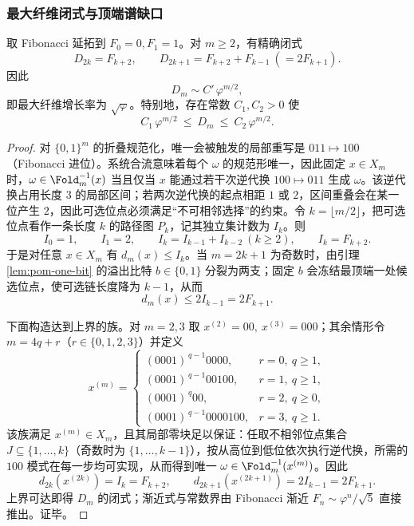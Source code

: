 \subsubsection{最大纤维闭式与顶端谱缺口}\label{subsec:pom-top-fiber}
\begin{theorem}[最大纤维闭式]\label{thm:pom-max-fiber}
取 Fibonacci 延拓到 $F_0=0,F_1=1$。对 $m\ge 2$，有精确闭式
\[
D_{2k}=F_{k+2},
\qquad
D_{2k+1}=F_{k+2}+F_{k-1}\ (=2F_{k+1}).
\]
因此
\[
D_m\sim C'\,\varphi^{m/2},
\]
即最大纤维增长率为 $\sqrt{\varphi}$。特别地，存在常数 $C_1,C_2>0$ 使
\[
C_1\,\varphi^{m/2}\ \le\ D_m\ \le\ C_2\,\varphi^{m/2}.
\]
\end{theorem}
\begin{proof}
对 $\{0,1\}^m$ 的折叠规范化，唯一会被触发的局部重写是
\(
011\mapsto 100
\)
（Fibonacci 进位）。系统合流意味着每个 $\omega$ 的规范形唯一，因此固定 $x\in X_m$ 时，$\omega\in\Fold_m^{-1}(x)$ 当且仅当 $x$ 能通过若干次逆代换 $100\mapsto 011$ 生成 $\omega$。该逆代换占用长度 $3$ 的局部区间；若两次逆代换的起点相距 $1$ 或 $2$，区间重叠会在某一位产生 $2$，因此可选位点必须满足“不可相邻选择”的约束。令 $k=\lfloor m/2\rfloor$，把可选位点看作一条长度 $k$ 的路径图 $P_k$，记其独立集计数为 $I_k$。则
\[
I_0=1,\qquad I_1=2,\qquad I_k=I_{k-1}+I_{k-2}\ (k\ge 2),
\qquad I_k=F_{k+2}.
\]
于是对任意 $x\in X_m$ 有 $d_m(x)\le I_k$。当 $m=2k+1$ 为奇数时，由引理 \ref{lem:pom-one-bit} 的溢出比特 $b\in\{0,1\}$ 分裂为两支；固定 $b$ 会冻结最顶端一处候选位点，使可选链长度降为 $k-1$，从而
\[
d_m(x)\le 2I_{k-1}=2F_{k+1}.
\]

下面构造达到上界的族。对 $m=2,3$ 取
\(
x^{(2)}=00,\ x^{(3)}=000
\)；其余情形令 $m=4q+r$（$r\in\{0,1,2,3\}$）并定义
\[
x^{(m)}=
\begin{cases}
(0001)^{\,q-1}0000,& r=0,\ q\ge 1,\\[2pt]
(0001)^{\,q-1}00100,& r=1,\ q\ge 1,\\[2pt]
(0001)^{\,q}00,& r=2,\ q\ge 0,\\[2pt]
(0001)^{\,q-1}0000100,& r=3,\ q\ge 1.
\end{cases}
\]
该族满足 $x^{(m)}\in X_m$，且其局部零块足以保证：任取不相邻位点集合 $J\subseteq\{1,\dots,k\}$（奇数时为 $\{1,\dots,k-1\}$），按从高位到低位依次执行逆代换，所需的 $100$ 模式在每一步均可实现，从而得到唯一 $\omega\in\Fold_m^{-1}(x^{(m)})$。因此
\[
d_{2k}(x^{(2k)})=I_k=F_{k+2},
\qquad
d_{2k+1}(x^{(2k+1)})=2I_{k-1}=2F_{k+1}.
\]
上界可达即得 $D_m$ 的闭式；渐近式与常数界由 Fibonacci 渐近 $F_n\sim \varphi^n/\sqrt5$ 直接推出。证毕。
\end{proof}


